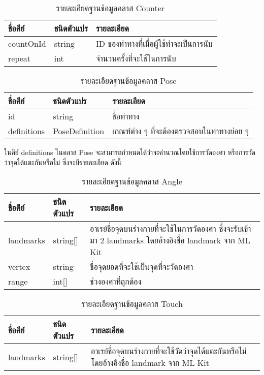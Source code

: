 \begin{table}
    \caption{รายละเอียดฐานข้อมูลคลาส Counter}
    \begin{tabularx}{\textwidth}{ | l | l | X | }
        \hline
        \bf ชื่อคีย์			& \bf ชนิดตัวแปร		& \bf รายละเอียด    \\\hline
        countOnId			& string			& ID ของท่าทางที่เมื่อผู้ใช้ทำจะเป็นการนับ\\\hline
        repeat				& int				& จำนวนครั้งที่จะใช้ในการนับ \\\hline
    \end{tabularx}
\end{table}

\begin{table}
    \caption{รายละเอียดฐานข้อมูลคลาส Pose}
    \begin{tabularx}{\textwidth}{ | l | l | X | }
        \hline
        \bf ชื่อคีย์			& \bf ชนิดตัวแปร		& \bf รายละเอียด    \\\hline
        id					& string			& ชื่อท่าทาง           \\\hline
        definitions			& PoseDefinition	& เกณฑ์ต่าง ๆ ที่จะต้องตรวจสอบในท่าทางย่อย ๆ \\\hline
    \end{tabularx}
\end{table}

ในคีย์ definitions ในคลาส Pose จะสามารถกำหนดได้ว่าจะคำนวณโดยใช้การวัดองศา หรือการวัดว่าจุดได้แตะกันหรือไม่ ซึ่งจะมีรายละเอียด ดังนี้
\begin{table}
    \caption{รายละเอียดฐานข้อมูลคลาส Angle}
    \begin{tabularx}{\textwidth}{ | l | l | X | }
        \hline
        \bf ชื่อคีย์			& \bf ชนิดตัวแปร		& \bf รายละเอียด    \\\hline
        landmarks			& string[]			& อาเรย์ชื่อจุดบนร่างกายที่จะใช้ในการวัดองศา ซึ่งจะรับเข้ามา 2 landmarks โดยอ้างอิงชื่อ landmark จาก ML Kit\\\hline
        vertex				& string			& ชื่อจุดยอดที่จะใช้เป็นจุดที่จะวัดองศา\\\hline
        range				& int[]				& ช่วงองศาที่ถูกต้อง\\\hline
    \end{tabularx}
\end{table}

\begin{table}
    \caption{รายละเอียดฐานข้อมูลคลาส Touch}
    \begin{tabularx}{\textwidth}{ | l | l | X | }
        \hline
        \bf ชื่อคีย์			& \bf ชนิดตัวแปร		& \bf รายละเอียด    \\\hline
        landmarks			& string[]			& อาเรย์ชื่อจุดบนร่างกายที่จะใช้วัดว่าจุดได้แตะกันหรือไม่ โดยอ้างอิงชื่อ landmark จาก ML Kit\\\hline
    \end{tabularx}
\end{table}



